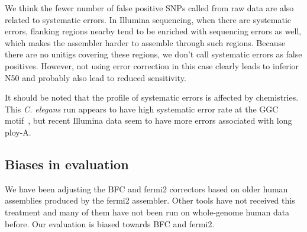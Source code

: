 \documentclass{bioinfo2}
\begin{document}
We think the fewer number of false positive SNPs called from raw data are also
related to systematic errors. In Illumina sequencing, when there are systematic
errors, flanking regions nearby tend to be enriched with sequencing errors as
well, which makes the assembler harder to assemble through such regions.
Because there are no unitigs covering these regions, we don't call systematic
errors as false positives. However, not using error correction in this case
clearly leads to inferior N50 and probably also lead to reduced sensitivity.

It should be noted that the profile of systematic errors is affected by
chemistries. This {\it C. elegans} run appears to have high systematic error
rate at the GGC motif~\citep{Nakamura:2011aa}, but recent Illumina data seem
to have more errors associated with long ploy-A.

\subsection{Biases in evaluation}
We have been adjusting the BFC and fermi2 correctors based on older human
assemblies produced by the fermi2 assembler. Other tools have not received this
treatment and many of them have not been run on whole-genome human data before.
Our evaluation is biased towards BFC and fermi2.



\end{document}
